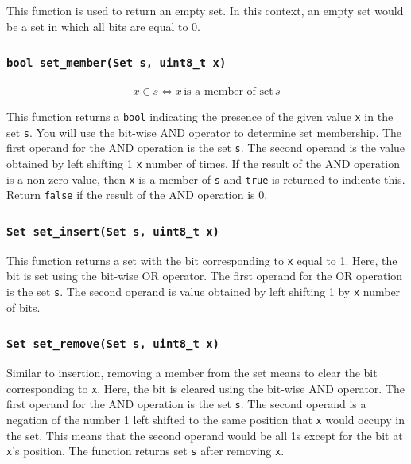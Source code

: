 \documentclass[11pt]{article}
\begin{document}
This function is used to return an empty set. In this context, an empty
set would be a set in which all bits are equal to 0.

\subsubsection{\texttt{bool set\_member(Set s, uint8\_t x)}}

\begin{align*}
  x \in s \iff x\, \text{is a member of set}\, s
\end{align*}

\noindent This function returns a \texttt{bool} indicating the presence
of the given value \texttt{x} in the set \texttt{s}. You will use the
bit-wise AND operator to determine set membership. The first operand for
the AND operation is the set \texttt{s}. The second operand is the value
obtained by left shifting 1 \texttt{x} number of times. If the result of
the AND operation is a non-zero value, then \texttt{x} is a member of
\texttt{s} and \texttt{true} is returned to indicate this. Return
\texttt{false} if the result of the AND operation is 0.

\subsubsection{\texttt{Set set\_insert(Set s, uint8\_t x)}}

This function returns a set with the bit corresponding to \texttt{x}
equal to 1. Here, the bit is set using the bit-wise OR operator. The
first operand for the OR operation is the set \texttt{s}. The second
operand is value obtained by left shifting 1 by \texttt{x} number of
bits.

\subsubsection{\texttt{Set set\_remove(Set s, uint8\_t x)}}

Similar to insertion, removing a member from the set means to clear the
bit corresponding to \texttt{x}. Here, the bit is cleared using the
bit-wise AND operator. The first operand for the AND operation is the
set \texttt{s}. The second operand is a negation of the number 1 left
shifted to the same position that \texttt{x} would occupy in the set.
This means that the second operand would be all 1s except for the bit at
\texttt{x}'s position. The function returns set \texttt{s} after
removing \texttt{x}.
\end{document}
